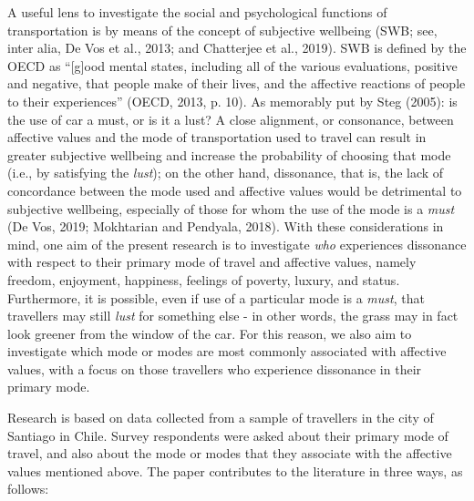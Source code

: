 \documentclass[]{elsarticle} %
\begin{document}
A useful lens to investigate the social and psychological functions of
transportation is by means of the concept of subjective wellbeing (SWB;
see, inter alia, De Vos et al., 2013; and Chatterjee et al., 2019). SWB
is defined by the OECD as ``{[}g{]}ood mental states, including all of
the various evaluations, positive and negative, that people make of
their lives, and the affective reactions of people to their
experiences'' (OECD, 2013, p. 10). As memorably put by Steg (2005): is
the use of car a must, or is it a lust? A close alignment, or
consonance, between affective values and the mode of transportation used
to travel can result in greater subjective wellbeing and increase the
probability of choosing that mode (i.e., by satisfying the \emph{lust});
on the other hand, dissonance, that is, the lack of concordance between
the mode used and affective values would be detrimental to subjective
wellbeing, especially of those for whom the use of the mode is a
\emph{must} (De Vos, 2019; Mokhtarian and Pendyala, 2018). With these
considerations in mind, one aim of the present research is to
investigate \emph{who} experiences dissonance with respect to their
primary mode of travel and affective values, namely freedom, enjoyment,
happiness, feelings of poverty, luxury, and status. Furthermore, it is
possible, even if use of a particular mode is a \emph{must}, that
travellers may still \emph{lust} for something else - in other words,
the grass may in fact look greener from the window of the car. For this
reason, we also aim to investigate which mode or modes are most commonly
associated with affective values, with a focus on those travellers who
experience dissonance in their primary mode.

Research is based on data collected from a sample of travellers in the
city of Santiago in Chile. Survey respondents were asked about their
primary mode of travel, and also about the mode or modes that they
associate with the affective values mentioned above. The paper
contributes to the literature in three ways, as follows:
\end{document}
